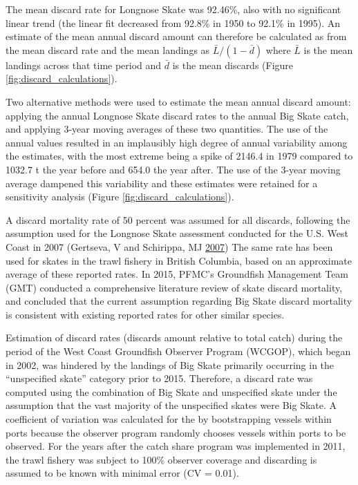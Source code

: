 \documentclass[12pt,]{article}
\begin{document}
The mean discard rate for Longnose Skate was 92.46\%, also with no
significant linear trend (the linear fit decreased from 92.8\% in 1950
to 92.1\% in 1995). An estimate of the mean annual discard amount can
therefore be calculated as from the mean discard rate and the mean
landings as \(\bar{L} / (1 - \bar{d})\) where \(\bar{L}\) is the mean
landings across that time period and \(\bar{d}\) is the mean discards
(Figure \ref{fig:discard_calculations}).

Two alternative methods were used to estimate the mean annual discard
amount: applying the annual Longnose Skate discard rates to the annual
Big Skate catch, and applying 3-year moving averages of these two
quantities. The use of the annual values resulted in an implausibly high
degree of annual variability among the estimates, with the most extreme
being a spike of 2146.4 in 1979 compared to 1032.7 t the year before and
654.0 the year after. The use of the 3-year moving average dampened this
variability and these estimates were retained for a sensitivity analysis
(Figure \ref{fig:discard_calculations}).

A discard mortality rate of 50 percent was assumed for all discards,
following the assumption used for the Longnose Skate assessment
conducted for the U.S. West Coast in 2007 (Gertseva, V and Schirippa, MJ
\protect\hyperlink{ref-Gertseva2007}{2007}) The same rate has been used
for skates in the trawl fishery in British Columbia, based on an
approximate average of these reported rates. In 2015, PFMC's Groundfish
Management Team (GMT) conducted a comprehensive literature review of
skate discard mortality, and concluded that the current assumption
regarding Big Skate discard mortality is consistent with existing
reported rates for other similar species.

Estimation of discard rates (discards amount relative to total catch)
during the period of the West Coast Groundfish Observer Program (WCGOP),
which began in 2002, was hindered by the landings of Big Skate primarily
occurring in the ``unspecified skate'' category prior to 2015.
Therefore, a discard rate was computed using the combination of Big
Skate and unspecified skate under the assumption that the vast majority
of the unspecified skates were Big Skate. A coefficient of variation was
calculated for the by bootstrapping vessels within ports because the
observer program randomly chooses vessels within ports to be observed.
For the years after the catch share program was implemented in 2011, the
trawl fishery was subject to 100\% observer coverage and discarding is
assumed to be known with minimal error (CV = 0.01).
\end{document}
